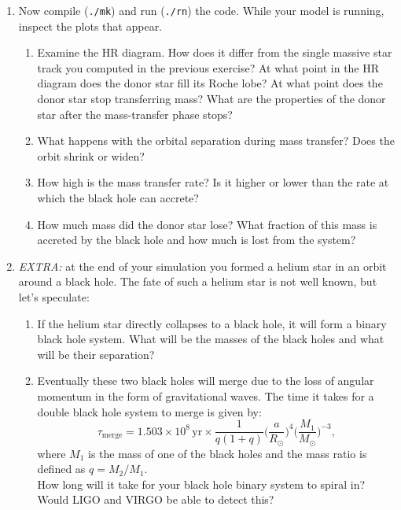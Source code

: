 \documentclass[11pt,a4paper]{article}
\begin{document}
\begin{enumerate}
\addtocounter{enumi}{2}
\item Now compile (\verb|./mk|) and run (\verb|./rn|) the code. While your model is running, inspect the plots that appear.
\begin{enumerate}
\item Examine the HR diagram. How does it differ from the single massive star track you computed in the previous exercise? At what point in the HR diagram does the donor star fill its Roche lobe? At what point does the donor star stop transferring mass? What are the properties of the donor star after the mass-transfer phase stops?
\item What happens with the orbital separation during mass transfer? Does the orbit shrink or widen?
\item How high is the mass transfer rate? Is it higher or lower than the rate at which the black hole can accrete?
\item How much mass did the donor star lose? What fraction of this mass is accreted by the black hole and how much is lost from the system?
\end{enumerate}
\item \textit{EXTRA:} at the end of your simulation you formed a helium star in an orbit around a black hole. The fate of such a helium star is not well known, but let's speculate:
\begin{enumerate}
\item If the helium star directly collapses to a black hole, it will form a binary black hole system. What will be the masses of the black holes and what will be their separation?
\item Eventually these two black holes will merge due to the loss of angular momentum in the form of gravitational waves. The time it takes for a double black hole system to merge is given by:
\begin{equation*}
\tau_{\mathrm{merge}} = 1.503 \times 10^8\,\mathrm{yr} \times \frac{1}{q(1+q)}\bigg(\frac{a}{R_\odot}\bigg)^4\bigg(\frac{M_1}{M_\odot}\bigg)^{-3},
\end{equation*}
where $M_1$ is the mass of one of the black holes and the mass ratio is defined as $q=M_2/M_1$.\\[1ex]
How long will it take for your black hole binary system to spiral in? Would LIGO and VIRGO be able to detect this?
\end{enumerate}
\end{enumerate}
\end{document}
